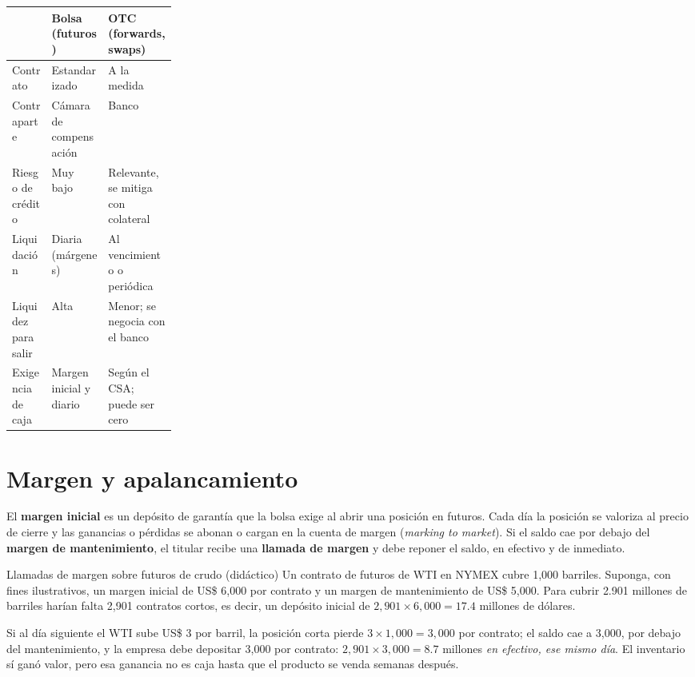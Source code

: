 \begin{center}\small
{}\label{tab:otc}
\begin{tabularx}{\linewidth}{@{}>{\raggedright\arraybackslash}p{0.24\linewidth}>{\raggedright\arraybackslash}X>{\raggedright\arraybackslash}X@{}}
\toprule
& Bolsa (futuros) & OTC (forwards, swaps) \\
\midrule
Contrato & Estandarizado & A la medida \\
Contraparte & Cámara de compensación & Banco \\
Riesgo de crédito & Muy bajo & Relevante, se mitiga con colateral \\
Liquidación & Diaria (márgenes) & Al vencimiento o periódica \\
Liquidez para salir & Alta & Menor; se negocia con el banco \\
Exigencia de caja & Margen inicial y diario & Según el CSA; puede ser cero \\
\bottomrule
\end{tabularx}
\end{center}

\section{Margen y apalancamiento}

\begin{definicion}[Margen]
El \textbf{margen inicial} es un depósito de garantía que la bolsa exige al abrir una posición en futuros. Cada día la posición se valoriza al precio de cierre y las ganancias o pérdidas se abonan o cargan en la cuenta de margen (\emph{marking to market}). Si el saldo cae por debajo del \textbf{margen de mantenimiento}, el titular recibe una \textbf{llamada de margen} y debe reponer el saldo, en efectivo y de inmediato.
\end{definicion}

\begin{ejemplo}{Llamadas de margen sobre futuros de crudo (didáctico)}
Un contrato de futuros de WTI en NYMEX cubre 1,000 barriles. Suponga, con fines ilustrativos, un margen inicial de US\$ 6,000 por contrato y un margen de mantenimiento de US\$ 5,000. Para cubrir 2.901 millones de barriles harían falta 2,901 contratos cortos, es decir, un depósito inicial de $2{,}901\times6{,}000=17.4$ millones de dólares.

Si al día siguiente el WTI sube US\$ 3 por barril, la posición corta pierde $3\times1{,}000=3{,}000$ por contrato; el saldo cae a 3,000, por debajo del mantenimiento, y la empresa debe depositar 3,000 por contrato: $2{,}901\times3{,}000=8.7$ millones \emph{en efectivo, ese mismo día}. El inventario sí ganó valor, pero esa ganancia no es caja hasta que el producto se venda semanas después.
\end{ejemplo}

